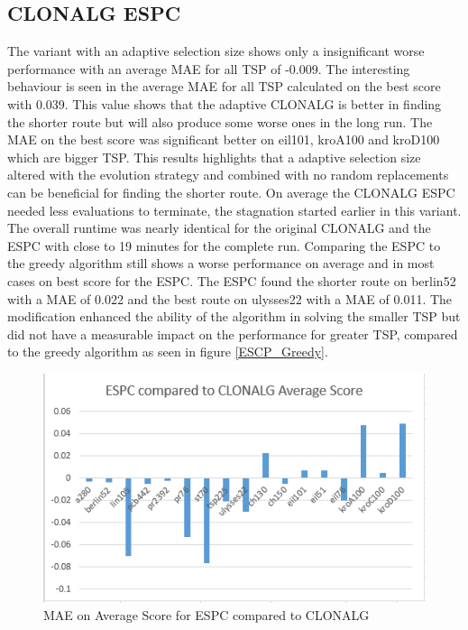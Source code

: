 \subsection{CLONALG ESPC}
The variant with an adaptive selection size shows only a insignificant worse performance with an average MAE for all TSP of -0.009. The interesting behaviour is seen in the average MAE for all TSP calculated on the best score with 0.039. This value shows that the adaptive CLONALG is better in finding the shorter route but will also produce some worse ones in the long run. The MAE on the best score was significant better on eil101, kroA100 and kroD100 which are bigger TSP. This results highlights that a adaptive selection size altered with the evolution strategy and combined with no random replacements can be beneficial for finding the shorter route. On average the CLONALG ESPC needed less evaluations to terminate, the stagnation started earlier in this variant. The overall runtime was nearly identical for the original CLONALG and the ESPC with close to 19 minutes for the complete run. Comparing the ESPC to the greedy algorithm still shows a worse performance on average and in most cases on best score for the ESPC. The ESPC found the shorter route on berlin52 with a MAE of 0.022 and the best route on ulysses22 with a MAE of 0.011. The modification enhanced the ability of the algorithm in solving the smaller TSP but did not have a measurable impact on the performance for greater TSP, compared to the greedy algorithm as seen in figure \ref{ESCP_Greedy}.\\
\begin{figure}[h]
\includegraphics[]{Images/ESPC_Fig_Avg.png}
\caption{MAE on Average Score for ESPC compared to CLONALG}
\label{ESCP_AVG}
\end{figure}
